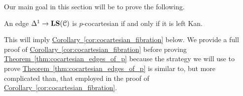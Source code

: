 \documentclass[main.tex]{subfiles}
\begin{document}
Our main goal in this section will be to prove the following.

\begin{theorem}
  \label{thm:cocartesian_edges_of_p}
  An edge $\Delta^{1} \to \mathbf{LS}(\mathcal{C})$ is $p$-cocartesian if and only if it is left Kan.
\end{theorem}

This will imply \hyperref[cor:cocartesian_fibration]{Corollary~\ref*{cor:cocartesian_fibration}} below. We provide a full proof of \hyperref[cor:cocartesian_fibration]{Corollary~\ref*{cor:cocartesian_fibration}} before proving \hyperref[thm:cocartesian_edges_of_p]{Theorem~\ref*{thm:cocartesian_edges_of_p}} because the strategy we will use to prove \hyperref[thm:cocartesian_edges_of_p]{Theorem~\ref*{thm:cocartesian_edges_of_p}} is similar to, but more complicated than, that employed in the proof of \hyperref[cor:cocartesian_fibration]{Corollary~\ref*{cor:cocartesian_fibration}}.
\end{document}
